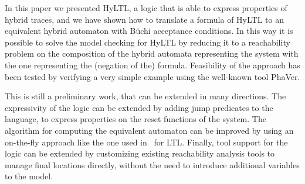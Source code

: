 \documentclass[submission,copyright,creativecommons]{eptcs}
\newcommand{\hyltl}{\textsf{HyLTL}\xspace}
\newcommand{\ltl}{\textsf{LTL}\xspace}
\begin{document}
In this paper we presented \hyltl, a logic that is able to express properties of hybrid traces, and we have shown how to translate a formula of \hyltl to an equivalent hybrid automaton with B\"uchi acceptance conditions.
In this way it is possible to solve the model checking for \hyltl by reducing it to a reachability problem on the composition of the hybrid automata representing the system with the one representing the (negation of the) formula.
Feasibility of the approach has been tested by verifying a very simple example using the well-known tool PhaVer.

This is still a preliminary work, that can be extended in many directions. The expressivity of the logic can be extended by adding jump predicates to the language, to express properties on the reset functions of the system. 
The algorithm for computing the equivalent automaton can be improved by using an on-the-fly approach like the one used in~\cite{Gerth95} for \ltl. Finally, tool support for the logic can be extended by customizing existing reachability analysis tools to manage final locations directly, without the need to introduce additional variables to the model.



\end{document}
